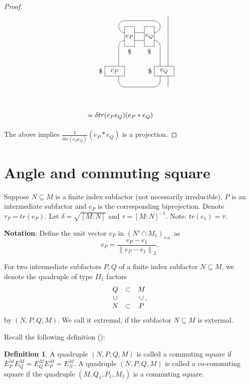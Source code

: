 \documentclass[11pt,letterpaper]{amsart}
\theoremstyle{definition}
\newtheorem{definition}[theorem]{Definition}
\theoremstyle{remark}
\begin{document}
\begin{proof}
\begin{equation*}
\begin{tikzpicture}
\draw (4.7,-.25)--(4.7,1.5);
\draw (7.2,-.55)--(7.2,3.05);
\draw (5,1.8) arc[radius=.3,start angle=90, end angle=180];
\draw (5,2.2) arc[radius=.3,start angle=270,end angle=90];
\draw (6.5,1.8) arc [radius=.3, start angle=90, end angle=0];
\draw (6.5,2.2) arc [radius=.3,start angle=270, end angle=450];
\draw (6.5,2.8)--(5,2.8);
\draw (6.8,1.5)--(6.8,-.25);
\draw (5,2.2)--(6,2.2);
\draw (5,1.8)--(6,1.8);
\draw (4.7,-.25) arc[radius=.3, start angle=180, end angle=270];
\draw (6.8,-.25) arc[radius=.3, start angle=0, end angle=-90];
\draw (5,-.55)--(6.5,-.55);
\draw [fill=white] (6,1.5) rectangle (6.5,2.5);
\draw [fill=white](4,0) rectangle (5,.5);
\draw [fill=white](6.5,0) rectangle (7.5,.5);
\draw [fill=white] (5,1.5) rectangle (5.5,2.5);
\node at (4,.25) [left] {$\$$};
\node at (6.5,.25)[left] {$\$$};
\node at (4.5,.25) {$e_P$};
\node at (7,.25) {$e_Q$};
\node at (5.25,1.5)[below] {$\$$};
\node at (6.25,1.5)[below] {$\$$};
\node at (5.25,2) {$e_P$};
\node at (6.25,2) {$e_Q$};
\node at (3,-2)[right] {$=\delta tr(e_Pe_Q)(e_P * e_Q)$};
\end{tikzpicture}
\end{equation*}

The above implies $\frac{1}{\delta tr(e_Pe_Q)}(e_P * e_Q)$ is a projection.
\end{proof} 
 


\section{Angle and commuting square}
\label{Sec:angle}


Suppose $N\subseteq M$ is a finite index subfactor (not necessarily irreducible), $P$ is an intermediate subfactor and $e_P$ is the corresponding biprojection.
Denote $\tau_P=tr(e_P)$. Let $\delta= \sqrt{[M:N]}$ and $\tau={[M:N]}^{-1}$. Note: $tr(e_1)=\tau$.

\noindent \textbf{Notation}:
Define the unit vector $v_P$ in $(N'\cap M_1)_{s.a.}$ as
$$v_P= \frac{e_P-e_1}{{\lVert e_P-e_1\rVert}_2}.$$

For two intermediate subfactors $P,Q$ of a finite index subfactor $N\subseteq M$,
 we denote the quadruple of type $II_1$ factors $$\begin{matrix}
Q &\subset & M \cr
\cup &\ &\cup\cr
N  &\subset & P
\end{matrix},$$ by $(N,P,Q,M).$ 
We call it extremal, if the subfactor $N \subseteq M$ is extermal.

Recall the following definition (\cite{SW}):
\begin{definition}\label{Def:square}
 A quadruple $(N,P,Q,M)$ is called a commuting square if
$E^M_P E^M_Q= E^M_Q E^M_P = E^M_N$.
 A quadruple $(N,P,Q,M)$ is called a co-commuting square if the quadruple $(M,Q_1,P_1,M_1)$ is a commuting square.
 \end{definition}
\end{document}
